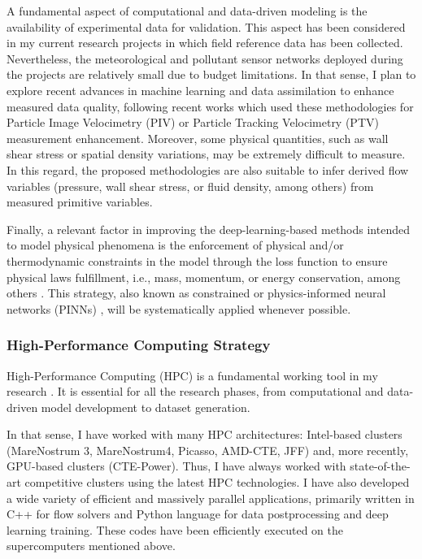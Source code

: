 \documentclass{article}
\begin{document}
A fundamental aspect of computational and data-driven modeling is the availability of experimental data for validation. This aspect has been considered in my current research projects in which field reference data has been collected. Nevertheless, the meteorological and pollutant sensor networks deployed during the projects are relatively small due to budget limitations. In that sense, I plan to explore recent advances in machine learning and data assimilation \cite{ALM22,ARC21} to enhance measured data quality, following recent works which used these methodologies for Particle Image Velocimetry (PIV) \cite{HAS23} or Particle Tracking Velocimetry (PTV) \cite{MON22} measurement enhancement. Moreover, some physical quantities, such as wall shear stress or spatial density variations, may be extremely difficult to measure. In this regard, the proposed methodologies are also suitable to infer derived flow variables (pressure, wall shear stress, or fluid density, among others) from measured primitive variables.

Finally, a relevant factor in improving the deep-learning-based methods intended to model physical phenomena is the enforcement of physical and/or thermodynamic constraints in the model through the loss function to ensure physical laws fulfillment, i.e., mass, momentum, or energy conservation, among  others \cite{LEE21}. This strategy, also known as constrained or physics-informed neural networks  (PINNs) \cite{RAI17}, will be systematically applied whenever possible.


\subsubsection{High-Performance Computing Strategy}

High-Performance Computing (HPC) is a fundamental working tool in my research \cite{VOL19}. It is essential for all the research phases, from computational and data-driven model development to dataset generation. 

In that sense, I have worked with many HPC architectures: Intel-based clusters (MareNostrum 3, MareNostrum4, Picasso, AMD-CTE, JFF) and, more recently, GPU-based clusters (CTE-Power). Thus, I have always worked with state-of-the-art competitive clusters using the latest HPC technologies. I have also developed a wide variety of efficient and massively parallel applications, primarily written in C++ for flow solvers and Python language for data postprocessing and deep learning training. These codes have been efficiently executed on the supercomputers mentioned above. 
\end{document}
